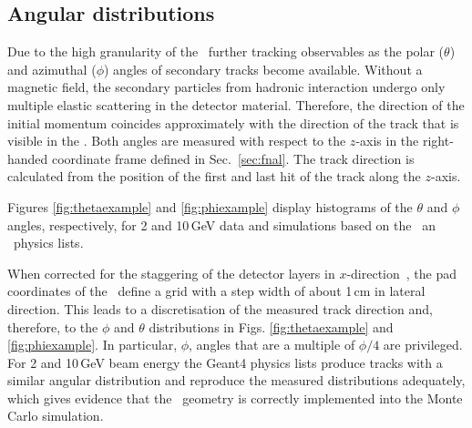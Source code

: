 \subsection{Angular distributions}
Due to the high granularity of the \ecal\, further tracking observables as the polar ($\theta$) and azimuthal ($\phi$) angles of secondary tracks become available.
Without a magnetic field, the secondary particles from hadronic interaction undergo only multiple elastic scattering in the detector material. Therefore, the direction of the initial momentum coincides approximately with the direction of the track that is visible in the \ecal.
Both angles are measured with respect to the $z$-axis in the right-handed coordinate frame defined in Sec.~\ref{sec:fnal}. The track direction is calculated from the position of the first and last hit of the track along the $z$-axis. 

Figures \ref{fig:thetaexample} and \ref{fig:phiexample} display histograms of the $\theta$ and $\phi$ angles, respectively, for 2 and 10\,GeV data and simulations based on the \ftfp\ an \qgsp\ physics lists. 

When corrected for the staggering of the detector layers in $x$-direction~\cite{Anduze:2008hq}, the pad coordinates of the \ecal\ define a grid with a step width of about 1\,cm in lateral direction. 
This leads to a discretisation of the measured track direction and, therefore, to the $\phi$ and $\theta$ distributions in Figs. \ref{fig:thetaexample} and \ref{fig:phiexample}. In particular, $\phi$, angles that are a multiple of $\phi/4$ are privileged.
For 2 and 10\,GeV beam energy the {\sc Geant4} physics lists produce tracks with a similar angular distribution and reproduce the measured distributions adequately, which gives evidence that the \ecal\ geometry is correctly implemented into the Monte Carlo simulation.

